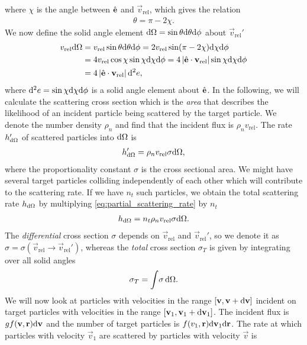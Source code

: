 where $\chi$ is the angle between $\hat {\mathbf{e}}$ and $\vec v_\text{rel}$, which gives the relation
\begin{align}
	\theta = \pi - 2\chi.
\end{align}
We now define the solid angle element $\mathrm{d}\Omega=\sin\theta \mathrm{d}\theta \mathrm{d}\phi$ about $\vec v_\text{rel}'$ 
\begin{align}
	v_\text{rel} \mathrm{d}\Omega &= v_\text{rel}\sin\theta \mathrm{d}\theta \mathrm{d}\phi = 2v_\text{rel}\sin(\pi - 2\chi)\mathrm{d}\chi \mathrm{d}\phi\\
	&= 4v_\text{rel}\cos\chi\sin\chi \mathrm{d}\chi \mathrm{d}\phi = 4\left|\hat {\mathbf{e}}\cdot\mathbf v_\text{rel}\right|\sin\chi \mathrm{d}\chi \mathrm{d}\phi\\
	&= 4\left|\hat {\mathbf{e}}\cdot\mathbf v_\text{rel}\right|\mathrm{d}^2e,
\end{align}
where $\mathrm{d}^2e = \sin\chi \mathrm{d}\chi \mathrm{d}\phi$ is a solid angle element about $\hat {\mathbf{e}}$. In the following, we will calculate the scattering cross section which is the \textit{area} that describes the likelihood of an incident particle being scattered by the target particle. We denote the number density $\rho_n$ and find that the incident flux is $\rho_n v_\text{rel}$. The rate $h_{\mathrm{d}\Omega}'$ of scattered particles into $\mathrm{d}\Omega$ is
\begin{align}
	\label{eq:partial_scattering_rate}
	h_{\mathrm{d}\Omega}' = \rho_n v_\text{rel}\sigma \mathrm{d}\Omega,
\end{align}
where the proportionality constant $\sigma$ is the cross sectional area. We might have several target particles colliding independently of each other which will contribute to the scattering rate. If we have $n_t$ such particles, we obtain the total scattering rate $h_{\mathrm{d}\Omega}$ by multiplying \eqref{eq:partial_scattering_rate} by $n_t$
\begin{align}
	h_{\mathrm{d}\Omega} = n_t\rho_n v_\text{rel}\sigma \mathrm{d}\Omega.
\end{align}
The \textit{differential} cross section $\sigma$ depends on $\vec v_\text{rel}$ and $\vec v_\text{rel}'$, so we denote it as $\sigma = \sigma(\vec v_\text{rel}\rightarrow \vec v_\text{rel}')$, whereas the \textit{total} cross section $\sigma_T$ is given by integrating over all solid angles
\begin{align}
	\sigma_T = \int\! \sigma \, \mathrm{d}\Omega.
\end{align}
We will now look at particles with velocities in the range $[\mathbf v, \mathbf v + \mathrm{d}\mathbf v]$ incident on target particles with velocities in the range $[\mathbf v_1, \mathbf v_1 + \mathrm{d}\mathbf v_1]$. The incident flux is $gf(\mathbf v,\mathbf r)\mathrm{d}\mathbf v$ and the number of target particles is $f(v_1,\mathbf r)\mathrm{d}\mathbf v_1\mathrm{d}\mathbf r$. The rate at which particles with velocity $\vec v_1$ are scattered by particles with velocity $\vec v$ is 
